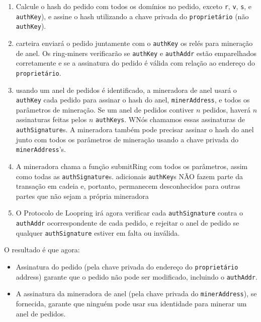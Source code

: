 \documentclass[UTF8,nofonts]{article}
\begin{document}
\begin{multicols}{2}
\begin{enumerate}
	\item Calcule o hash do pedido com todos os domínios no pedido, exceto \verb|r|, \verb|v|, \verb|s|, e \verb|authKey|), e assine o hash utilizando a chave privada do \verb|proprietário|  (não \verb|authKey|).

	\item  carteira enviará o pedido juntamente com o \verb|authKey| os relés para mineração de anel. Os ring-miners verificarão se  \verb|authKey| e \verb|authAddr| estão emparelhados corretamente e se a assinatura do pedido é válida com relação ao endereço do \verb|proprietário|.

	\item usando um anel de pedidos é identificado, a mineradora de anel usará o \verb|authKey|  cada pedido para assinar o hash do anel, \verb|minerAddress|, e todos os parâmetros de mineração. Se um anel de pedidos contiver $n$ pedidos, haverá $n$ assinaturas feitas pelos $n$ \verb|authKeys|. WNós chamamos essas assinaturas de \verb|authSignature|s.  A mineradora também pode precisar assinar o hash do anel junto com todos os parâmetros de mineração usando a chave privada do \verb|minerAddress|'s.

	\item 	A mineradora chama a função submitRing com todos os parâmetros, assim como todas as \verb|authSignature|s. adicionais \verb|authKey|s  NÃO fazem parte da transação em cadeia e, portanto, permanecem desconhecidos para outras partes que não sejam a própria mineradora



	\item O Protocolo de Loopring irá agora verificar cada \verb|authSignature|  contra o \verb|authAddr| ocorrespondente de cada pedido, e rejeitar o anel de pedido se qualquer \verb|authSignature| estiver em falta ou inválida.
 
\end{enumerate}


O resultado é que agora:

\begin{itemize}

	\item  Assinatura do pedido (pela chave privada do endereço do \verb|proprietário| address) garante que o pedido não pode ser modificado, incluindo o \verb|authAddr|.
	\item  A assinatura da mineradora de anel (pela chave privada do \verb|minerAddress|),  se fornecida, garante que ninguém pode usar sua identidade para minerar um anel de pedidos.


\end{itemize}
\end{multicols}
\end{document}

